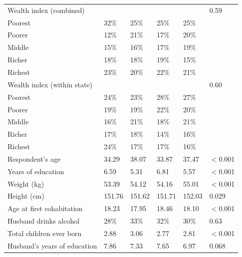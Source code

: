 \documentclass{article}        %
\begin{document}
\begin{landscape}
\begin{longtable}{@{}p{6cm}p{2.5cm}p{2.5cm}p{2.5cm}p{2.5cm}p{1.5cm}@{}}
\quad Wealth index (combined)                &        &        &        &        & 0.59     \\
\quad\quad Poorest                           & 32\%   & 25\%   & 25\%   & 25\%   &          \\
\quad\quad Poorer                            & 12\%   & 21\%   & 17\%   & 20\%   &          \\
\quad\quad Middle                            & 15\%   & 16\%   & 17\%   & 19\%   &          \\
\quad\quad Richer                            & 18\%   & 18\%   & 19\%   & 15\%   &          \\
\quad\quad Richest                           & 23\%   & 20\%   & 22\%   & 21\%   &          \\[4pt]

\quad Wealth index (within state)            &        &        &        &        & 0.60     \\
\quad\quad Poorest                           & 24\%   & 23\%   & 28\%   & 27\%   &          \\
\quad\quad Poorer                            & 19\%   & 19\%   & 22\%   & 20\%   &          \\
\quad\quad Middle                            & 16\%   & 21\%   & 18\%   & 21\%   &          \\
\quad\quad Richer                            & 17\%   & 18\%   & 14\%   & 16\%   &          \\
\quad\quad Richest                           & 24\%   & 17\%   & 17\%   & 16\%   &          \\[4pt]

\quad Respondent's age                       & 34.29  & 38.07  & 33.87  & 37.47  & $<$0.001 \\
\quad Years of education                     & 6.59   & 5.31   & 6.81   & 5.57   & $<$0.001 \\
\quad Weight (kg)                            & 53.39  & 54.12  & 54.16  & 55.01  & $<$0.001 \\
\quad Height (cm)                            & 151.76 & 151.62 & 151.71 & 152.03 & 0.029    \\
\quad Age at first cohabitation              & 18.23  & 17.95  & 18.46  & 18.10  & $<$0.001 \\
\quad Husband drinks alcohol                 & 28\%   & 33\%   & 32\%   & 30\%   & 0.63     \\
\quad Total children ever born               & 2.88   & 3.06   & 2.77   & 2.81   & $<$0.001 \\
\quad Husband's years of education           & 7.86   & 7.33   & 7.65   & 6.97   & 0.068    \\

\end{longtable}

\end{landscape}
\end{document}
